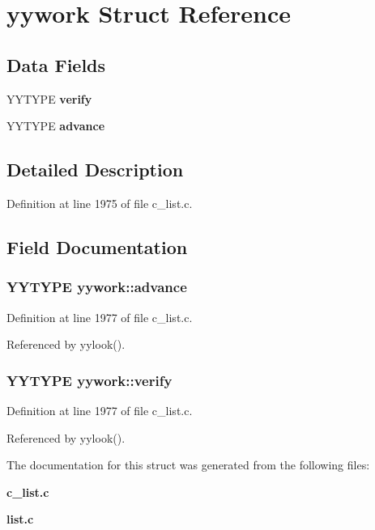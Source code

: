 \section{yywork Struct Reference}
\label{structyywork}
\subsection*{Data Fields}
\begin{CompactItemize}
\item 
YYTYPE \bf{verify}
\item 
YYTYPE \bf{advance}
\end{CompactItemize}


\subsection{Detailed Description}




Definition at line 1975 of file c\_\-list.c.

\subsection{Field Documentation}
\subsubsection{\setlength{\rightskip}{0pt plus 5cm}YYTYPE \bf{yywork::advance}}\label{structyywork_0b8c9decf0fe3c57a964686a67a0c67e}




Definition at line 1977 of file c\_\-list.c.

Referenced by yylook().
\subsubsection{\setlength{\rightskip}{0pt plus 5cm}YYTYPE \bf{yywork::verify}}\label{structyywork_f672c11bbc8fd1477df183e7ff5cbbbb}




Definition at line 1977 of file c\_\-list.c.

Referenced by yylook().

The documentation for this struct was generated from the following files:\begin{CompactItemize}
\item 
\bf{c\_\-list.c}\item 
\bf{list.c}\end{CompactItemize}
